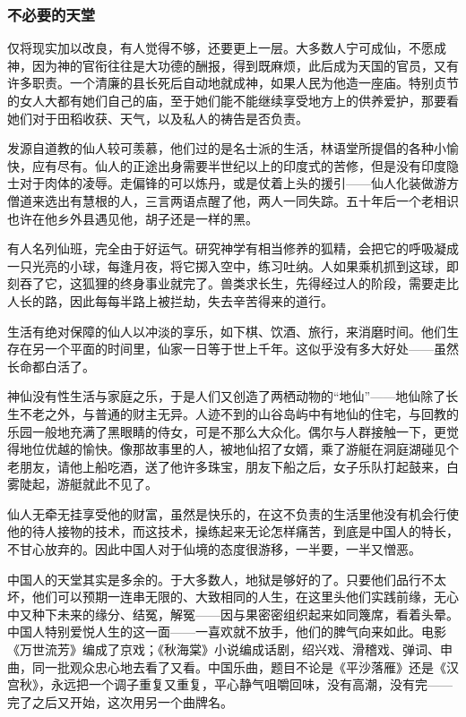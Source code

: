 \subsubsection*{不必要的天堂}
\par 仅将现实加以改良，有人觉得不够，还要更上一层。大多数人宁可成仙，不愿成神，因为神的官衔往往是大功德的酬报，得到既麻烦，此后成为天国的官员，又有许多职责。一个清廉的县长死后自动地就成神，如果人民为他造一座庙。特别贞节的女人大都有她们自己的庙，至于她们能不能继续享受地方上的供养爱护，那要看她们对于田稻收获、天气，以及私人的祷告是否负责。
\par 发源自道教的仙人较可羡慕，他们过的是名士派的生活，林语堂所提倡的各种小愉快，应有尽有。仙人的正途出身需要半世纪以上的印度式的苦修，但是没有印度隐士对于肉体的凌辱。走偏锋的可以炼丹，或是仗着上头的援引——仙人化装做游方僧道来选出有慧根的人，三言两语点醒了他，两人一同失踪。五十年后一个老相识也许在他乡外县遇见他，胡子还是一样的黑。
\par 有人名列仙班，完全由于好运气。研究神学有相当修养的狐精，会把它的呼吸凝成一只光亮的小球，每逢月夜，将它掷入空中，练习吐纳。人如果乘机抓到这球，即刻吞了它，这狐狸的终身事业就完了。兽类求长生，先得经过人的阶段，需要走比人长的路，因此每每半路上被拦劫，失去辛苦得来的道行。
\par 生活有绝对保障的仙人以冲淡的享乐，如下棋、饮酒、旅行，来消磨时间。他们生存在另一个平面的时间里，仙家一日等于世上千年。这似乎没有多大好处——虽然长命都白活了。
\par 神仙没有性生活与家庭之乐，于是人们又创造了两栖动物的“地仙”——地仙除了长生不老之外，与普通的财主无异。人迹不到的山谷岛屿中有地仙的住宅，与回教的乐园一般地充满了黑眼睛的侍女，可是不那么大众化。偶尔与人群接触一下，更觉得地位优越的愉快。像那故事里的人，被地仙招了女婿，乘了游艇在洞庭湖碰见个老朋友，请他上船吃酒，送了他许多珠宝，朋友下船之后，女子乐队打起鼓来，白雾陡起，游艇就此不见了。
\par 仙人无牵无挂享受他的财富，虽然是快乐的，在这不负责的生活里他没有机会行使他的待人接物的技术，而这技术，操练起来无论怎样痛苦，到底是中国人的特长，不甘心放弃的。因此中国人对于仙境的态度很游移，一半要，一半又憎恶。
\par 中国人的天堂其实是多余的。于大多数人，地狱是够好的了。只要他们品行不太坏，他们可以预期一连串无限的、大致相同的人生，在这里头他们实践前缘，无心中又种下未来的缘分、结冤，解冤——因与果密密组织起来如同篾席，看着头晕。中国人特别爱悦人生的这一面——一喜欢就不放手，他们的脾气向来如此。电影《万世流芳》编成了京戏；《秋海棠》小说编成话剧，绍兴戏、滑稽戏、弹词、申曲，同一批观众忠心地去看了又看。中国乐曲，题目不论是《平沙落雁》还是《汉宫秋》，永远把一个调子重复又重复，平心静气咀嚼回味，没有高潮，没有完——完了之后又开始，这次用另一个曲牌名。

